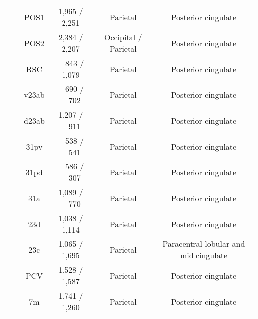\begin{table*}[t]
{\begin{tabular}{ l | l | c | c | c | c }
                                      &                                 & POS1                  & 1,965 / 2,251         & Parietal              & Posterior cingulate                       \\
                                      &                                 & POS2                  & 2,384 / 2,207         & Occipital / Parietal  & Posterior cingulate                       \\
                                      &                                 & RSC                   & ~~843 / 1,079         & Parietal              & Posterior cingulate                       \\
                                      &                                 & v23ab                 & ~~690 / ~~702         & Parietal              & Posterior cingulate                       \\
                                      &                                 & d23ab                 & 1,207 / ~~911         & Parietal              & Posterior cingulate                       \\
                                      &                                 & 31pv                  & ~~538 / ~~541         & Parietal              & Posterior cingulate                       \\
                                      &                                 & 31pd                  & ~~586 / ~~307         & Parietal              & Posterior cingulate                       \\
                                      &                                 & 31a                   & 1,089 / ~~770         & Parietal              & Posterior cingulate                       \\
                                      &                                 & 23d                   & 1,038 / 1,114         & Parietal              & Posterior cingulate                       \\
                                      &                                 & 23c                   & 1,065 / 1,695         & Parietal              & Paracentral lobular and mid cingulate     \\
                                      &                                 & PCV                   & 1,528 / 1,587         & Parietal              & Posterior cingulate                       \\
                                      &                                 & 7m                    & 1,741 / 1,260         & Parietal              & Posterior cingulate                       \\

\end{tabular}}
\end{table*}
